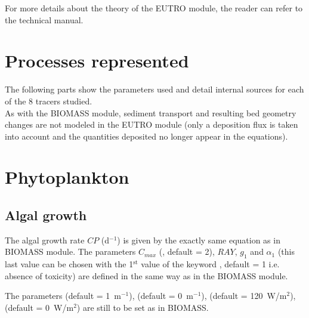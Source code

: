 For more details about the theory of the EUTRO module,
the reader can refer to the \waqtel technical manual.


\section{Processes represented}


The following parts show the parameters used and detail internal sources for each of the 8 tracers studied.\\

As with the BIOMASS module, sediment transport and resulting bed geometry changes
are not modeled in the EUTRO module
(only a deposition flux is taken into account and the quantities deposited no longer appear in the equations).\\


\section{Phytoplankton}

\subsection{Algal growth}

The algal growth rate $CP$ (d$^{-1}$) is given by
the exactly same equation as in BIOMASS module.
The parameters $C_{max}$
(, default = 2),
$RAY$, $g_1$ and $\alpha_1$
(this last value can be chosen with the 1$^{\textrm{st}}$ value of the keyword
, default = 1 i.e. absence of toxicity)
are defined in the same way as in the BIOMASS module.

The parameters
 (default = 1~m$^{-1}$),
 (default = 0~m$^{-1}$),
 (default = 120~W/m$^2$),
 (default = 0~W/m$^2$)
are still to be set as in BIOMASS.\\

